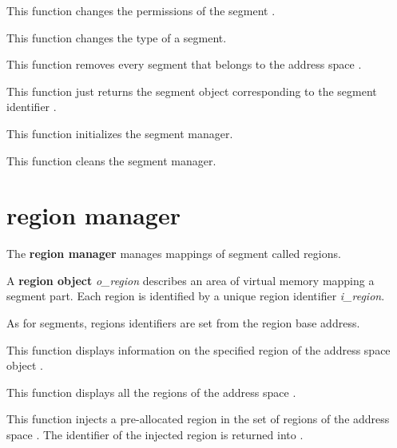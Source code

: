 	 {
	   This function changes the permissions of the segment .
	 }

	 {
	   This function changes the type of a segment.
	 }

	 {
	   This function removes every segment that belongs to the
	   address space .
	 }

	 {
	   This function just returns the segment object
	   corresponding to the segment identifier .
	 }

	 {
	   This function initializes the segment manager.
	 }

	 {
	   This function cleans the segment manager.
	 }

%
%

\section{region manager}

The \textbf{region manager} manages mappings of segment called regions.

A \textbf{region object} \textit{o\_region} describes an area of virtual
memory mapping a segment part. Each region is identified by a unique region
identifier \textit{i\_region}.

As for segments, regions identifiers are set from the region base address.

	 {
	   This function displays information on the specified region
	    of the address space object .
	 }

	 {
	   This function displays all the regions of the address space
	   .
	 }

	 {
	   This function injects a pre-allocated region in the set of
	   regions of the address space . The identifier of
	   the injected region is returned into .
	 }

